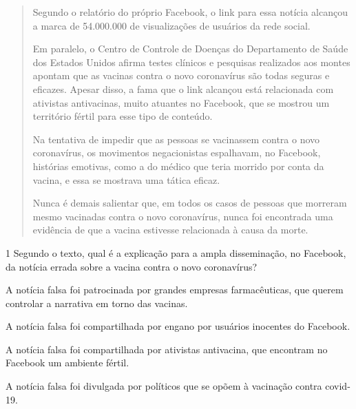\begin{quote}
Segundo o relatório do próprio Facebook, o link para essa notícia alcançou
a marca de 54.000.000 de visualizações de usuários da rede social.

Em paralelo, o Centro de Controle de Doenças do Departamento de Saúde dos Estados
Unidos afirma testes clínicos e pesquisas realizados aos montes apontam que as
vacinas contra o novo coronavírus são todas seguras e eficazes. Apesar disso, a
fama que o link alcançou está relacionada com ativistas antivacinas, muito atuantes
no Facebook, que se mostrou um território fértil para esse tipo de conteúdo.

Na tentativa de impedir que as pessoas se vacinassem contra o novo coronavírus,
os movimentos negacionistas espalhavam, no Facebook, histórias emotivas, como
a do médico que teria morrido por conta da vacina, e essa se mostrava uma
tática eficaz.

Nunca é demais salientar que, em todos os casos de pessoas que morreram
mesmo vacinadas contra o novo coronavírus, nunca foi encontrada uma evidência
de que a vacina estivesse relacionada à causa da morte.

\end{quote}

\num{1} Segundo o texto, qual é a explicação para a ampla
disseminação, no Facebook, da notícia errada sobre a vacina contra o novo coronavírus?

\begin{escolha}
\item A notícia falsa foi patrocinada por grandes empresas farmacêuticas,
que querem controlar a narrativa em torno das vacinas.

\item A notícia falsa foi compartilhada por engano por usuários inocentes
do Facebook.

\item A notícia falsa foi compartilhada por ativistas antivacina, que
encontram no Facebook um ambiente fértil.

\item A notícia falsa foi divulgada por políticos que se opõem à vacinação contra covid-19.
\end{escolha}


